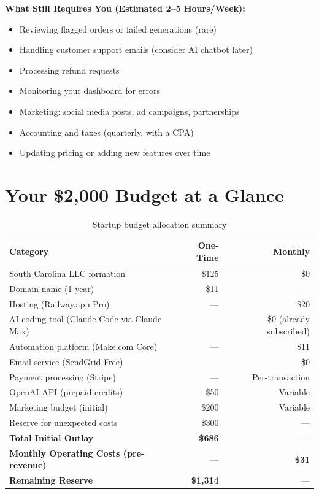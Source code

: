 \documentclass[12pt, letterpaper, oneside]{book}
\begin{document}
\begin{warningbox}
\textbf{What Still Requires You (Estimated 2--5 Hours/Week):}
\begin{itemize}[leftmargin=1.5em, itemsep=2pt]
  \item Reviewing flagged orders or failed generations (rare)
  \item Handling customer support emails (consider AI chatbot later)
  \item Processing refund requests
  \item Monitoring your dashboard for errors
  \item Marketing: social media posts, ad campaigns, partnerships
  \item Accounting and taxes (quarterly, with a CPA)
  \item Updating pricing or adding new features over time
\end{itemize}
\end{warningbox}

\section*{Your \$2{,}000 Budget at a Glance}

\begin{table}[H]
\centering
\begin{tabularx}{\textwidth}{Xrr}
\toprule
\textbf{Category} & \textbf{One-Time} & \textbf{Monthly} \\
\midrule
South Carolina LLC formation & \$125 & \$0 \\
Domain name (1 year) & \$11 & --- \\
Hosting (Railway.app Pro) & --- & \$20 \\
AI coding tool (Claude Code via Claude Max) & --- & \$0 (already subscribed) \\
Automation platform (Make.com Core) & --- & \$11 \\
Email service (SendGrid Free) & --- & \$0 \\
Payment processing (Stripe) & --- & Per-transaction \\
OpenAI API (prepaid credits) & \$50 & Variable \\
Marketing budget (initial) & \$200 & Variable \\
Reserve for unexpected costs & \$300 & --- \\
\midrule
\textbf{Total Initial Outlay} & \textbf{\$686} & --- \\
\textbf{Monthly Operating Costs (pre-revenue)} & --- & \textbf{\$31} \\
\textbf{Remaining Reserve} & \textbf{\$1{,}314} & --- \\
\bottomrule
\end{tabularx}
\caption{Startup budget allocation summary}
\end{table}
\end{document}
